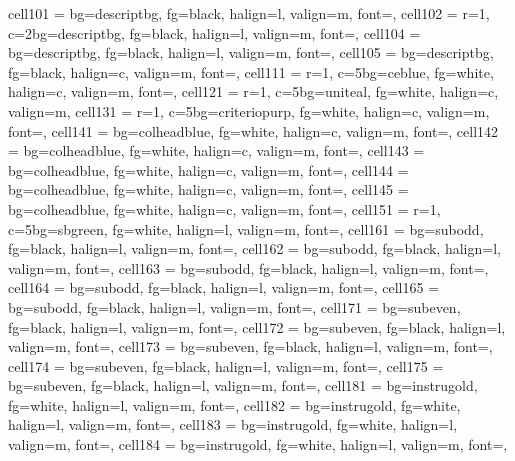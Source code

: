\documentclass[a4paper,12pt]{article}
\begin{document}
\begin{longtblr}
{  %
  cell{10}{1} = {bg=descriptbg, fg=black, halign=l, valign=m, font=\footnotesize},
  cell{10}{2} = {r=1, c=2}{bg=descriptbg, fg=black, halign=l, valign=m, font=\footnotesize},
  cell{10}{4} = {bg=descriptbg, fg=black, halign=l, valign=m, font=\footnotesize},
  cell{10}{5} = {bg=descriptbg, fg=black, halign=c, valign=m, font=\footnotesize\bfseries},
  cell{11}{1} = {r=1, c=5}{bg=ceblue, fg=white, halign=c, valign=m, font=\small\bfseries},
  cell{12}{1} = {r=1, c=5}{bg=uniteal, fg=white, halign=c, valign=m},
  cell{13}{1} = {r=1, c=5}{bg=criteriopurp, fg=white, halign=c, valign=m, font=\small\bfseries},
  cell{14}{1} = {bg=colheadblue, fg=white, halign=c, valign=m, font=\bfseries},
  cell{14}{2} = {bg=colheadblue, fg=white, halign=c, valign=m, font=\bfseries},
  cell{14}{3} = {bg=colheadblue, fg=white, halign=c, valign=m, font=\bfseries},
  cell{14}{4} = {bg=colheadblue, fg=white, halign=c, valign=m, font=\bfseries},
  cell{14}{5} = {bg=colheadblue, fg=white, halign=c, valign=m, font=\bfseries},
  cell{15}{1} = {r=1, c=5}{bg=sbgreen, fg=white, halign=l, valign=m, font=\small\bfseries},
  cell{16}{1} = {bg=subodd,  fg=black, halign=l, valign=m, font=\footnotesize},
  cell{16}{2} = {bg=subodd,  fg=black, halign=l, valign=m, font=\footnotesize},
  cell{16}{3} = {bg=subodd,  fg=black, halign=l, valign=m, font=\footnotesize},
  cell{16}{4} = {bg=subodd,  fg=black, halign=l, valign=m, font=\footnotesize},
  cell{16}{5} = {bg=subodd,  fg=black, halign=l, valign=m, font=\footnotesize},
  cell{17}{1} = {bg=subeven, fg=black, halign=l, valign=m, font=\footnotesize},
  cell{17}{2} = {bg=subeven, fg=black, halign=l, valign=m, font=\footnotesize},
  cell{17}{3} = {bg=subeven, fg=black, halign=l, valign=m, font=\footnotesize},
  cell{17}{4} = {bg=subeven, fg=black, halign=l, valign=m, font=\footnotesize},
  cell{17}{5} = {bg=subeven, fg=black, halign=l, valign=m, font=\footnotesize},
  cell{18}{1} = {bg=instrugold, fg=white, halign=l, valign=m, font=\footnotesize},
  cell{18}{2} = {bg=instrugold, fg=white, halign=l, valign=m, font=\footnotesize},
  cell{18}{3} = {bg=instrugold, fg=white, halign=l, valign=m, font=\footnotesize},
  cell{18}{4} = {bg=instrugold, fg=white, halign=l, valign=m, font=\footnotesize},
}
\end{longtblr}
\end{document}

